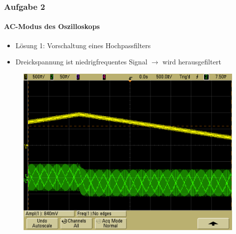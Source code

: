 \begin{frame}
\frametitle{Aufgabe 2}
\framesubtitle{AC-Modus des Oszilloskops}
\begin{itemize}
    \item Lösung 1: Vorschaltung eines Hochpassfilters
    \item Dreickspannung ist niedrigfrequentes Signal $\rightarrow$ wird
    herausgefiltert
\end{itemize}
\begin{figure}[H]
    \begin{center}
            \includegraphics[scale=0.2]{./img/2c_Dreieck.png}
    \end{center}
\end{figure}
\end{frame}
